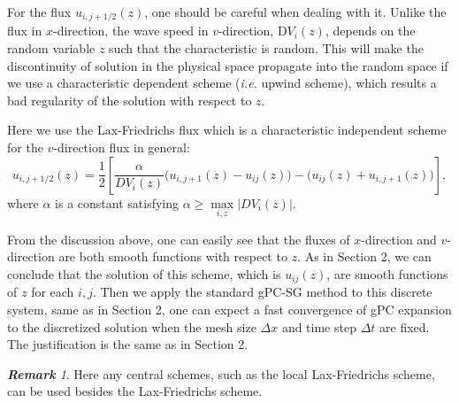 \documentclass[12pt]{article}
\theoremstyle{plain}
\theoremstyle{remark}
\newtheorem{remark}{\bf{Remark}}[section]
\theoremstyle{remark}
\theoremstyle{remark}
\numberwithin{equation}{section}
\newcommand{\ie}{{\it i.e. \/}}
\newcommand{\Dx}{\Delta x}
\newcommand{\Dt}{\Delta t}
\begin{document}
For the flux $u_{i, j+1/2}(z)$, one should be careful when dealing with it. Unlike the flux in $x$-direction, the wave speed in $v$-direction, $\mathrm{D} V_i(z)$, depends on the random variable $z$ such that the characteristic is random. This will make the discontinuity of solution in the physical space propagate into the random space if we use a characteristic dependent scheme (\ie upwind scheme), which results a bad regularity of the solution with respect to $z$. 

Here we use the Lax-Friedrichs flux which is a characteristic independent scheme for the $v$-direction flux in general:
\begin{equation}\label{v-direction}
  u_{i,j+1/2}(z) = \frac{1}{2}\left[\frac{\alpha}{DV_i(z)}\big(u_{i,j+1}(z) - u_{ij}(z)\big) - \big(u_{ij}(z) + u_{i,j+1}(z)\big)\right],
\end{equation}
where $\alpha$ is a constant satisfying $\alpha\geq \max\limits_{i, z}|DV_i(z)|$.

From the discussion above, one can easily see that the fluxes of $x$-direction and $v$-direction are both smooth functions with respect to $z$. As in Section 2, we can conclude that the solution of this scheme, which is $u_{ij}(z)$, are smooth functions of $z$ for each $i, j$. Then we apply the standard gPC-SG method to this discrete system, same as in Section 2, one can expect a fast convergence of gPC expansion to the discretized solution when the mesh size $\Dx$ and time step $\Dt$ are fixed. The justification is the same as in Section 2.

\begin{remark}
Here any central schemes, such as the local Lax-Friedrichs scheme, can be used
besides the Lax-Friedrichs scheme.
\end{remark}
\end{document}
